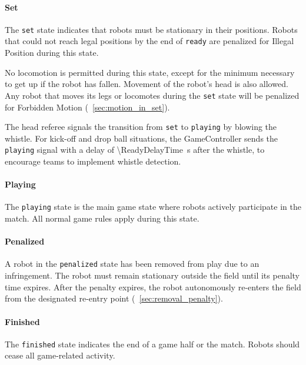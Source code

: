 \paragraph{Set}
\label{sec:state_set}

The \texttt{set} state indicates that robots must be stationary in their positions. Robots that could not reach legal positions by the end of \texttt{ready} are penalized for Illegal Position during this state.

No locomotion is permitted during this state, except for the minimum necessary to get up if the robot has fallen. Movement of the robot's head is also allowed. Any robot that moves its legs or locomotes during the \texttt{set} state will be penalized for Forbidden Motion (\cf~\cref{sec:motion_in_set}).

The head referee signals the transition from \texttt{set} to \texttt{playing} by blowing the whistle. For kick-off and drop ball situations, the GameController sends the \texttt{playing} signal with a delay of \qty{\ReadyDelayTime}{\second} after the whistle, to encourage teams to implement whistle detection.

\paragraph{Playing}
\label{sec:state_playing}

The \texttt{playing} state is the main game state where robots actively participate in the match. All normal game rules apply during this state.

\paragraph{Penalized}
\label{sec:state_penalized}

A robot in the \texttt{penalized} state has been removed from play due to an infringement. The robot must remain stationary outside the field until its penalty time expires. After the penalty expires, the robot autonomously re-enters the field from the designated re-entry point (\cf~\cref{sec:removal_penalty}).

\paragraph{Finished}
\label{sec:state_finished}

The \texttt{finished} state indicates the end of a game half or the match. Robots should cease all game-related activity.

